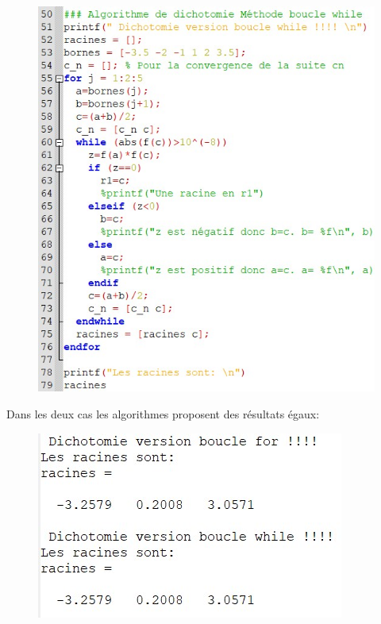 \documentclass{article}
\begin{document}
	\begin{center}
		\begin{figure}[H]
			\includegraphics[scale=0.7]{./img/algo_racines_f_dicho_whileloop.jpg}
		\end{figure}
	\end{center}
	
	Dans les deux cas les algorithmes proposent des résultats égaux:

	\begin{center}
		\begin{figure}[H]
			\includegraphics[scale=1]{./img/resultatrecherche.jpg}
		\end{figure}
	\end{center}
	
\end{document}
